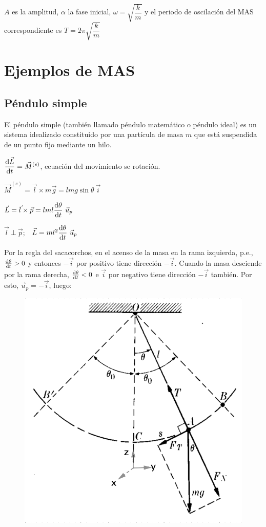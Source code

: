 {$A$ es la amplitud, $\alpha$ la fase inicial, $\omega=\sqrt{\dfrac k m}$ y el periodo de oscilación del MAS correspondiente es $T=2\pi \sqrt{\dfrac k m}$

\vspace{10mm} %
\section{Ejemplos de MAS}

\subsection{Péndulo simple}
El péndulo simple (también llamado péndulo matemático o péndulo ideal) es un sistema idealizado constituido por una partícula de masa $m$ que está suspendida de un punto fijo mediante un hilo.

\begin{multicols}{2}
$\displaystyle \dv{\vec L}{t}=\vec M^{(e)}$, ecuación del movimiento se rotación.	

$\vec M^{(e)}=\vec l \times m\vec g=lmg\sin \theta \ \vec i$

$\vec L= \displaystyle \vec l \times \vec p= l m l \dv{\theta}{t} \ \vec u_p$

$\vec l \ \bot \ \vec p; \ \ $
$\vec L = m l^2 \displaystyle \dv{\theta}{t}\ \vec u_p$

\small{Por la regla del sacacorchos, en el acenso de la masa en la rama izquierda, p.e., $\dv{\theta}{t}>0$ y entonces $-\vec i$ por positivo tiene dirección $-\vec i$. Cuando la masa desciende por la rama derecha, $\dv{\theta}{t}<0$ e $\vec i$ por negativo tiene dirección $-\vec i$ también. Por esto, $\vec u_p=-\vec i$, luego}\normalsize{:}
\begin{figure}[H]
		\centering
		\includegraphics[width=.45\textwidth]{imagenes/imagenes19/T19IM06.png}
	\end{figure}
\end{multicols}

}
